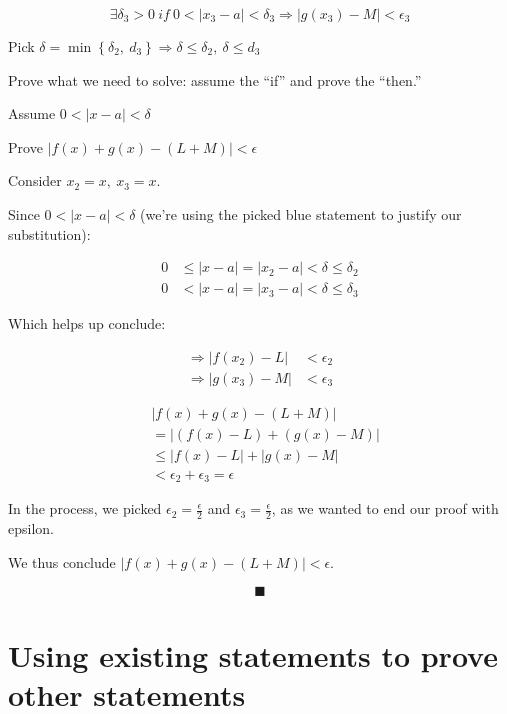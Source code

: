 \documentclass[
]{article}
\begin{document}
$$\exists\delta_{3} > 0\ if\ 0 < \left| x_{3} - a \right| < \delta_{3} \Rightarrow \left| g\left( x_{3} \right) - M \right| < \epsilon_{3}$$

Pick
$\delta = \min\left\{ \delta_{2},\ d_{3} \right\} \Rightarrow \delta \leq \delta_{2},\ \delta \leq d_{3}$

Prove what we need to solve: assume the ``if'' and prove the ``then.''

Assume $0 < |x - a| < \delta$

Prove $\left| f(x) + g(x) - (L + M) \right| < \epsilon$

Consider $x_{2} = x,\ x_{3} = x$.

Since $0 < |x - a| < \delta$ (we're using the picked blue statement to
justify our substitution):

\begin{align*}
0 &\leq |x - a| = \left| x_{2} - a \right| < \delta \leq \delta_{2}
 \\
0 &< |x - a| = \left| x_{3} - a \right| < \delta \leq \delta_{3}
\end{align*}


Which helps up conclude:

\begin{align*}
\Rightarrow \left| f\left( x_{2} \right) - L \right| &< \epsilon_{2}
 \\
\Rightarrow \left| g\left( x_{3} \right) - M \right| &< \epsilon_{3}
\end{align*}


\begin{align*}
&\left| f(x) + g(x) - (L + M) \right|
 \\
&= \left| \left( f(x) - L \right) + \left( g(x) - M \right) \right|
 \\
&\leq \left| f(x) - L \right| + \left| g(x) - M \right|
 \\
&< \epsilon_{2} + \epsilon_{3} = \epsilon
\end{align*}


In the process, we picked $\epsilon_{2} = \frac{\epsilon}{2}$ and
$\epsilon_{3} = \frac{\epsilon}{2}$, as we wanted to end our proof
with epsilon.

We thus conclude $\left| f(x) + g(x) - (L + M) \right| < \epsilon$.

$$\blacksquare$$


\section{Using existing statements to prove other
statements}
\end{document}
